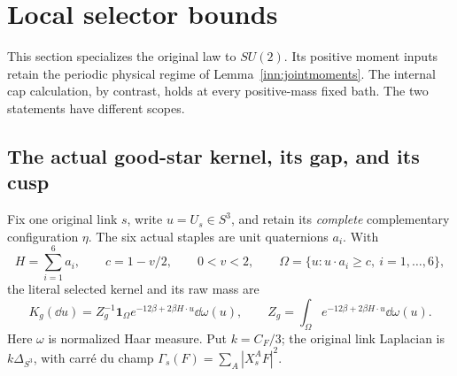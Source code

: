 \section{Local selector bounds}
\label{sel:section}

This section specializes the original law to \(SU(2)\). Its positive moment inputs retain the periodic physical regime of Lemma~\ref{inn:jointmoments}. The internal cap calculation, by contrast, holds at every positive-mass fixed bath. The two statements have different scopes.

\subsection{The actual good-star kernel, its gap, and its cusp}

Fix one original link \(s\), write \(u=U_s\in S^3\), and retain its \emph{complete} complementary configuration \(\eta\). The six actual staples are unit quaternions \(a_i\). With
\[
 H=\sum_{i=1}^6a_i,\qquad c=1-v/2,\qquad 0<v<2,\qquad
 \Omega=\{u:u\cdot a_i\ge c,\ i=1,\ldots,6\},
\]
the literal selected kernel and its raw mass are
\begin{equation}
 K_g(\dd u)=Z_g^{-1}\mathbf1_\Omega
       e^{-12\beta+2\beta H\cdot u}\dd\omega(u),\qquad
 Z_g=\int_\Omega e^{-12\beta+2\beta H\cdot u}\dd\omega(u).
 \label{sel:goodkernel}
\end{equation}
Here \(\omega\) is normalized Haar measure. Put \(k=C_F/3\); the original link Laplacian is \(k\Delta_{S^3}\), with carré du champ \(\Gamma_s(F)=\sum_A|X_s^AF|^2\).

